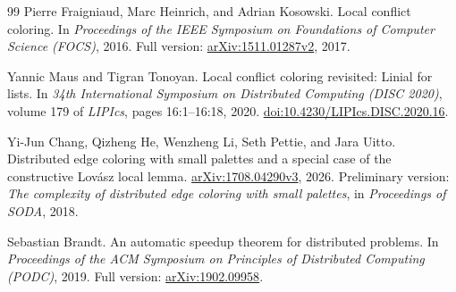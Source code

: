 \documentclass[11pt]{article}
\theoremstyle{definition}
\theoremstyle{remark}
\begin{document}
\begin{thebibliography}{99}
Pierre Fraigniaud, Marc Heinrich, and Adrian Kosowski.
Local conflict coloring.
In \emph{Proceedings of the IEEE Symposium on Foundations of Computer
Science (FOCS)}, 2016.
Full version: \href{https://arxiv.org/abs/1511.01287v2}{arXiv:1511.01287v2}, 2017.

Yannic Maus and Tigran Tonoyan.
Local conflict coloring revisited: Linial for lists.
In \emph{34th International Symposium on Distributed Computing (DISC 2020)},
volume 179 of \emph{LIPIcs}, pages 16:1--16:18, 2020.
\href{https://doi.org/10.4230/LIPIcs.DISC.2020.16}{doi:10.4230/LIPIcs.DISC.2020.16}.

Yi-Jun Chang, Qizheng He, Wenzheng Li, Seth Pettie, and Jara Uitto.
Distributed edge coloring with small palettes and a special case of the
constructive Lov\'asz local lemma.
\href{https://arxiv.org/abs/1708.04290v3}{arXiv:1708.04290v3}, 2026.
Preliminary version: \emph{The complexity of distributed edge coloring with
small palettes}, in \emph{Proceedings of SODA}, 2018.

Sebastian Brandt.
An automatic speedup theorem for distributed problems.
In \emph{Proceedings of the ACM Symposium on Principles of Distributed
Computing (PODC)}, 2019.
Full version: \href{https://arxiv.org/abs/1902.09958}{arXiv:1902.09958}.

\end{thebibliography}
\endgroup
\end{document}
